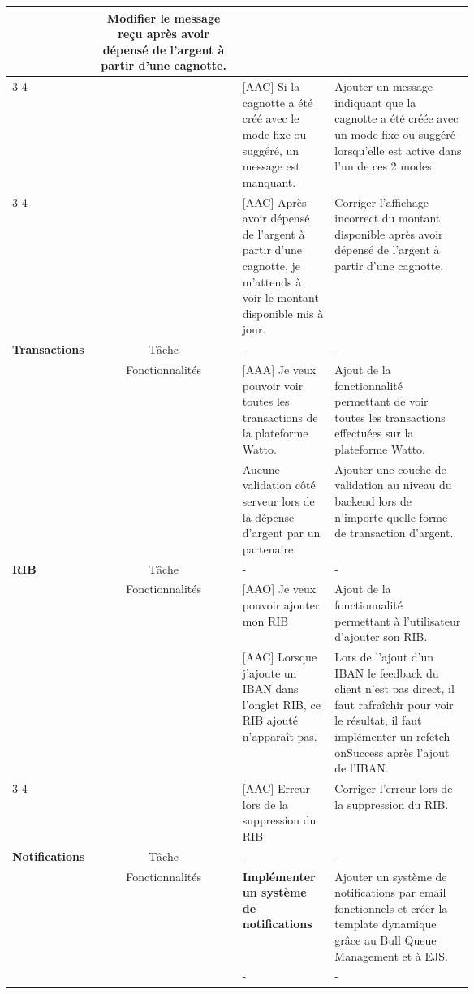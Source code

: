 \documentclass[../main.tex]{subfiles}
\begin{document}
\begin{longtable}{|p{0.165\linewidth} |c| p{0.20\linewidth}| p{0.30\linewidth}|}
    & Modifier le message reçu après avoir dépensé de l'argent à partir d'une cagnotte.\\
    \cline{3-4}
    & 
    &
    [AAC] Si la cagnotte a été créé avec le mode fixe ou suggéré, un message est manquant.
    & Ajouter un message indiquant que la cagnotte a été créée avec un mode fixe ou suggéré lorsqu'elle est active dans l'un de ces 2 modes. \\
    \cline{3-4}
    & 
    &
    [AAC] Après avoir dépensé de l'argent à partir d'une cagnotte, je m'attends à voir le montant disponible mis à jour.
    & Corriger l'affichage incorrect du montant disponible après avoir dépensé de l'argent à partir d'une cagnotte.\\
    \hline
    
    \multirow{3}{*}{\textbf{Transactions}} &
    Tâche & - & - \\
    \cline{2-4}
    &
    \multirow{2}{*}{Fonctionnalités} &
    [AAA] Je veux pouvoir voir toutes les transactions de la plateforme Watto.
    & Ajout de la fonctionnalité permettant de voir toutes les transactions effectuées sur la plateforme Watto.
    \\
    \cline{2-4}
    &
    Bug fix & 
    Aucune validation côté serveur lors de la dépense d'argent par un partenaire.
    & Ajouter une couche de validation au niveau du backend lors de n'importe quelle forme de transaction d'argent. \\
    \hline
    
    \multirow{3}{*}{\textbf{RIB}} &
    Tâche & - & - \\
    \cline{2-4}
    &
    \multirow{2}{*}{Fonctionnalités} &
    [AAO] Je veux pouvoir ajouter mon RIB
    & Ajout de la fonctionnalité permettant à l'utilisateur d'ajouter son RIB.
    \\
    \cline{2-4}
    &
    \multirow{2}{*}{Bug fix} & 
    [AAC] Lorsque j'ajoute un IBAN dans l'onglet RIB, ce RIB ajouté n'apparaît pas.
    & Lors de l'ajout d'un IBAN le feedback du client n'est pas direct, il faut rafraîchir pour voir le résultat, il faut implémenter un refetch onSuccess après l'ajout de l'IBAN.
    \\
    \cline{3-4}
    & 
    &
    [AAC] Erreur lors de la suppression du RIB
    & Corriger l'erreur lors de la suppression du RIB.
    \\
    \hline
    
    \multirow{3}{*}{\textbf{Notifications}} &
    Tâche & - & - \\
    \cline{2-4}
    &
    \multirow{2}{*}{Fonctionnalités} &
    \textbf{Implémenter un système de notifications}
    & Ajouter un système de notifications par email fonctionnels et créer la template dynamique grâce au Bull Queue Management et à EJS. 
    \\
    \cline{2-4}
    &
    Bug fix & - & - \\
    \hline
\end{longtable}
\end{document}
